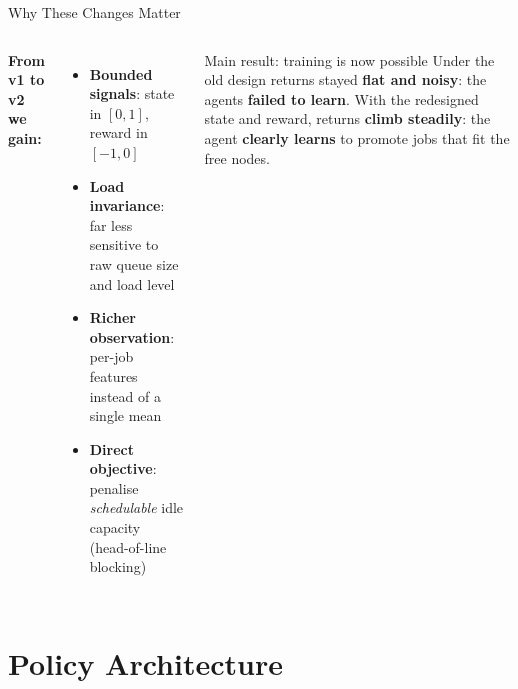 \begin{frame}{Why These Changes Matter}
  \begin{columns}[T]
      \textbf{From v1 to v2 we gain:}
      \begin{itemize}
        \item \textbf{Bounded signals}: state in $[0,1]$, reward in $[-1,0]$
        \item \textbf{Load invariance}: far less sensitive to raw queue size and load level
        \item \textbf{Richer observation}: per-job features instead of a single mean
        \item \textbf{Direct objective}: penalise \emph{schedulable} idle capacity (head-of-line blocking)
      \end{itemize}

      \begin{alertblock}{Main result: training is now possible}
        Under the old design returns stayed \textbf{flat and noisy}: the agents
        \textbf{failed to learn}. With the redesigned state and reward, returns
        \textbf{climb steadily}: the agent \textbf{clearly learns} to promote
        jobs that fit the free nodes.
      \end{alertblock}
  \end{columns}
\end{frame}


\section{Policy Architecture}

